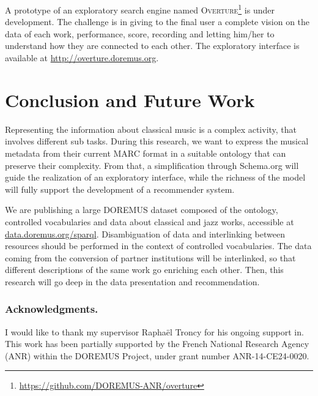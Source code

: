 \documentclass{llncs}
\begin{document}
A prototype of an exploratory search engine named \textsc{Overture}\footnote{\url{https://github.com/DOREMUS-ANR/overture}} is under development. The challenge is in giving to the final user a complete vision on the data of each work, performance, score, recording and letting him/her to understand how they are connected to each other. The exploratory interface is available at \url{http://overture.doremus.org}.


\section{Conclusion and Future Work}
\label{sec:conclusion}
Representing the information about classical music is a complex activity, that involves different sub tasks. During this research, we want to express the musical metadata from their current MARC format in a suitable ontology that can preserve their complexity. From that, a simplification through Schema.org will guide the realization of an exploratory interface, while the richness of the model will fully support the development of a recommender system.

We are publishing a large DOREMUS dataset composed of the ontology, controlled vocabularies and data about classical and jazz works, accessible at \url{data.doremus.org/sparql}. Disambiguation of data and interlinking between resources should be performed in the context of controlled vocabularies. The data coming from the conversion of partner institutions will be interlinked, so that different descriptions of the same work go enriching each other. Then, this research will go deep in the data presentation and recommendation.

\subsubsection*{Acknowledgments.}
I would like to thank my supervisor Rapha\"el Troncy for his ongoing support in. This work has been partially supported by the French National Research Agency (ANR) within the DOREMUS Project, under grant number ANR-14-CE24-0020.



\end{document}
